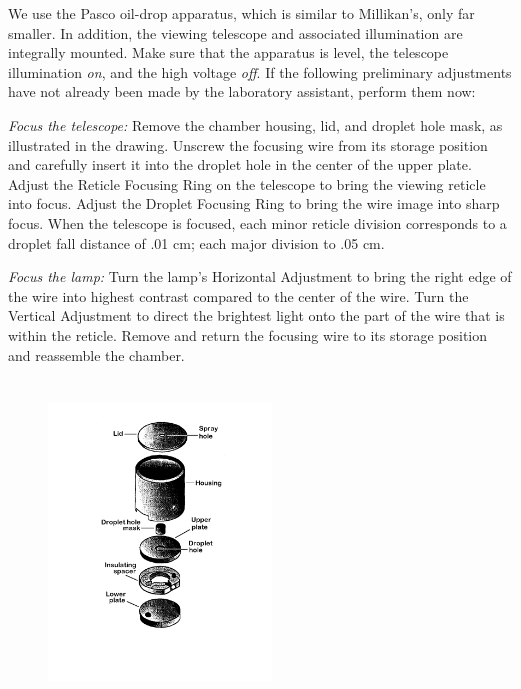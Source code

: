We use the Pasco oil-drop apparatus, which is similar to Millikan's,
only far smaller. In addition, the viewing telescope and associated
illumination are integrally mounted. Make sure that the apparatus is
level, the telescope illumination \emph{on}, and the high voltage
\emph{off}. If the following preliminary adjustments have not already
been made by the laboratory assistant, perform them now:

\emph{Focus the telescope:} Remove the chamber housing, lid, and droplet
hole mask, as illustrated in the drawing. Unscrew the focusing wire from
its storage position and carefully insert it into the droplet hole in
the center of the upper plate. Adjust the Reticle Focusing Ring on the
telescope to bring the viewing reticle into focus. Adjust the Droplet
Focusing Ring to bring the wire image into sharp focus. When the
telescope is focused, each minor reticle division corresponds to a
droplet fall distance of .01 cm; each major division to .05 cm.

\emph{Focus the lamp:} Turn the lamp's Horizontal Adjustment to bring
the right edge of the wire into highest contrast compared to the center
of the wire. Turn the Vertical Adjustment to direct the brightest light
onto the part of the wire that is within the reticle. Remove and return
the focusing wire to its storage position and reassemble the chamber.

\begin{figure} %
  \begin{center}
    \includegraphics[width=2.33056in,height=3.38264in]{images/03_millikan/image067.png}
  \end{center}
\end{figure}

